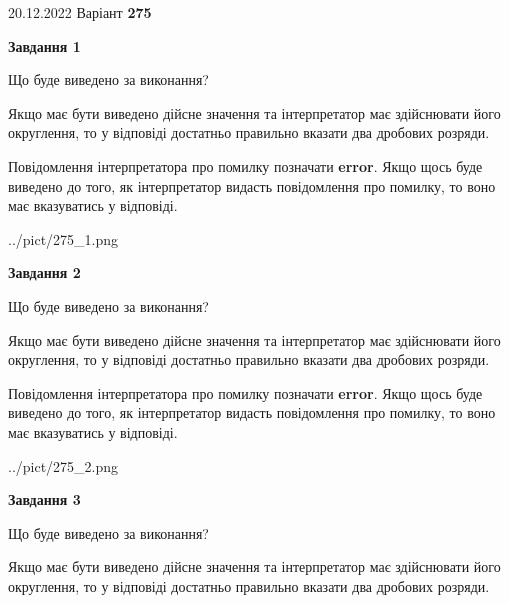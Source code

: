 \documentclass[12pt, ukrainian]{article}
\begin{document}
{20.12.2022 Варіант \No \textbf { 275 }\par}
{
\begin {Large}

{\begin {center}\textbf{Завдання 1}\end {center}}\par
Що буде виведено за виконання? \par

Якщо має бути виведено дійсне значення та інтерпретатор має здійснювати його округлення, 
то у відповіді достатньо правильно вказати два дробових розряди.

Повідомлення інтерпретатора про помилку позначати \textbf{error}.
Якщо щось буде виведено до того, як інтерпретатор видасть повідомлення про помилку, 
то воно має вказуватись у відповіді. \par

\begin{center}
	{../pict/275_1.png}
\end{center}
\newpage

{\begin {center}\textbf{Завдання 2}\end {center}}\par
Що буде виведено за виконання? \par

Якщо має бути виведено дійсне значення та інтерпретатор має здійснювати його округлення, 
то у відповіді достатньо правильно вказати два дробових розряди.

Повідомлення інтерпретатора про помилку позначати \textbf{error}.
Якщо щось буде виведено до того, як інтерпретатор видасть повідомлення про помилку, 
то воно має вказуватись у відповіді. \par

\begin{center}
	{../pict/275_2.png}
\end{center}
\newpage

{\begin {center}\textbf{Завдання 3}\end {center}}\par
Що буде виведено за виконання? \par

Якщо має бути виведено дійсне значення та інтерпретатор має здійснювати його округлення, 
то у відповіді достатньо правильно вказати два дробових розряди.


\end{Large}}
\end{document}

